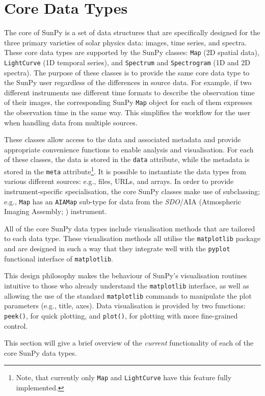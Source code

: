 \section{Core Data Types}\label{sec:DataTypes}

The core of SunPy is a set of data structures that are specifically
designed for the three primary varieties of solar physics data:
images, time series, and spectra. These core data types are supported
by the SunPy classes: \texttt{Map} (2D spatial data),
\texttt{LightCurve} (1D temporal series), and \texttt{Spectrum} and
\texttt{Spectrogram} (1D and 2D spectra).  The purpose of these
classes is to provide the same core data type to the SunPy user
regardless of the differences in source data.  For example, if two
different instruments use different time formats to describe the
observation time of their images, the corresponding SunPy \texttt{Map}
object for each of them expresses the observation time in the same
way.  This simplifies the workflow for the user when handling data
from multiple sources.

These classes allow access to the data
and associated metadata and provide appropriate convenience functions to
enable analysis and visualisation. For each of these classes, the data is
stored in the \texttt{data} attribute, while the metadata is stored 
in the \texttt{meta} attribute\footnote{Note, that currently only \texttt{Map} and \texttt{LightCurve} have this feature 
fully implemented.}. 
It is possible to instantiate the
data types from various
different sources: e.g., files, URLs, and arrays.  
In order to provide instrument-specific specialisation, the core SunPy classes 
make use of subclassing; e.g., \texttt{Map} has an \texttt{AIAMap} 
sub-type for data from the \textit{SDO}/AIA (Atmospheric Imaging Assembly; \citealt{lemen2012}) instrument. 

All of the core SunPy data types 
include visualisation methods that are tailored to each data type. 
These visualisation methods all utilise the \texttt{matplotlib} 
package and are designed in such a way that they integrate well with 
the \texttt{pyplot} functional interface of \texttt{matplotlib}.

This design philosophy makes the behaviour of SunPy's visualisation 
routines intuitive to those who already understand the \texttt{matplotlib}
interface, as well as allowing the use of the standard 
\texttt{matplotlib} commands to manipulate the plot parameters (e.g., title, axes).
Data visualisation is provided by two functions: \texttt{peek()}, for quick 
plotting, and \texttt{plot()}, for plotting with more fine-grained control.

This section will give a brief overview of the \textit{current} functionality 
of each of the core SunPy data types.




